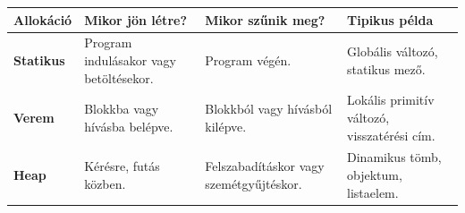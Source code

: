 \begin{tabularx}{\textwidth}{>{\bfseries}lXXX}
Allokáció & Mikor jön létre? & Mikor szűnik meg? & Tipikus példa \\
\midrule
Statikus & Program indulásakor vagy betöltésekor. & Program végén. & Globális változó, statikus mező. \\
Verem & Blokkba vagy hívásba belépve. & Blokkból vagy hívásból kilépve. & Lokális primitív változó, visszatérési cím. \\
Heap & Kérésre, futás közben. & Felszabadításkor vagy szemétgyűjtéskor. & Dinamikus tömb, objektum, listaelem. \\
\end{tabularx}
